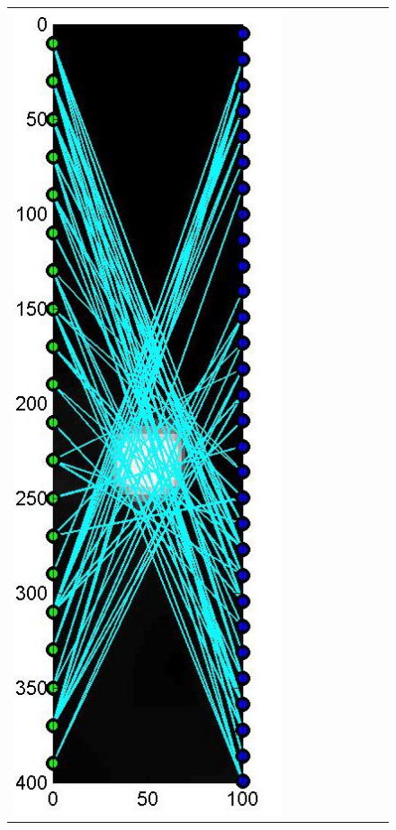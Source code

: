 \documentclass[11pt]{article}
\begin{document}
{\begin{figure}[!h]
\begin{center}
\begin{tabular}{|c|c|c|c|c|c|c|c|c|}
			\includegraphics[width=.9\iwidth]{figures/newFigs/noisy/resultsExp-5-designs}
			&

\end{tabular}
\end{center}
\end{figure}}
\end{document}
